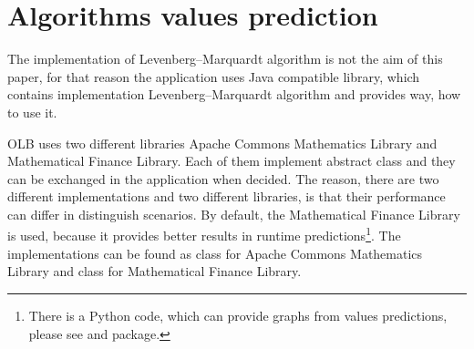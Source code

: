 \section{Algorithms values prediction}\label{sec:impl-algorithms-values-predictions}
The implementation of Levenberg–Marquardt algorithm is not the aim of this paper,
for that reason the application uses Java compatible library, 
which contains implementation Levenberg–Marquardt algorithm 
and provides way, 
how to use it.

OLB uses two different libraries Apache Commons Mathematics Library\cite{web:apacheCommonsMath}
and Mathematical Finance Library\cite{web:finmathLib}.
Each of them implement  abstract class and they can be exchanged in the application when decided.
The reason, there are two different implementations and two different libraries,
is that their performance can differ in distinguish scenarios.
By default, the Mathematical Finance Library is used, 
because it provides better results in runtime predictions\footnote{
    There is a Python code, 
    which can provide graphs from values predictions, 
    please see  
    and  package.
}.
The implementations can be found as  class for Apache Commons Mathematics Library
and  class for Mathematical Finance Library.
